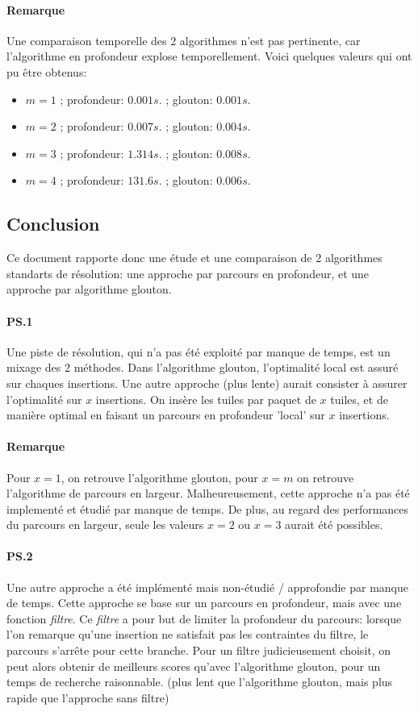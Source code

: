 \documentclass[10pt]{article}
\begin{document}
	\paragraph{Remarque} Une comparaison temporelle des 2 algorithmes n'est pas pertinente, car l'algorithme en profondeur explose temporellement.
	Voici quelques valeurs qui ont pu être obtenus:
	\begin{itemize}[label=-]
	  \item $m=1$ ; profondeur: $0.001 s.$ ; glouton: $0.001 s.$
	  \item $m=2$ ; profondeur: $0.007 s.$ ; glouton: $0.004 s.$
	  \item $m=3$ ; profondeur: $1.314 s.$ ; glouton: $0.008 s.$
	  \item $m=4$ ; profondeur: $131.6 s.$ ; glouton: $0.006 s.$
	\end{itemize}
      \subsection{Conclusion}
	Ce document rapporte donc une étude et une comparaison de 2 algorithmes standarts de résolution: une approche par parcours en profondeur,
	et une approche par algorithme glouton.
	\paragraph{PS.1}
	Une piste de résolution, qui n'a pas été exploité par manque de temps, est un mixage des 2 méthodes.
	Dans l'algorithme glouton, l'optimalité local est assuré sur chaques insertions.
	Une autre approche (plus lente) aurait consister à assurer l'optimalité sur $x$ insertions.
	On insère les tuiles par paquet de $x$ tuiles, et de manière optimal en faisant un parcours en profondeur 'local' sur $x$ insertions.
	\paragraph{Remarque} Pour $x=1$, on retrouve l'algorithme glouton, pour $x=m$ on retrouve l'algorithme de parcours en largeur.
	\newline
	\newline
	Malheureusement, cette approche n'a pas été implementé et étudié par manque de temps.
	De plus, au regard des performances du parcours en largeur, seule les valeurs $x=2$ ou $x=3$ aurait été possibles.
	
	\paragraph{PS.2}
	Une autre approche a été implémenté mais non-étudié / approfondie par manque de temps.
	Cette approche se base sur un parcours en profondeur, mais avec une fonction \textit{filtre}.
	Ce \textit{filtre} a pour but de limiter la profondeur du parcours: lorsque l'on remarque qu'une insertion
	ne satisfait pas les contraintes du filtre, le parcours s'arrête pour cette branche.
	Pour un filtre judicieusement choisit, on peut alors obtenir de meilleurs scores qu'avec l'algorithme glouton,
	pour un temps de recherche raisonnable. (plus lent que l'algorithme glouton, mais plus rapide que l'approche sans filtre)
    \newpage
\end{document}
